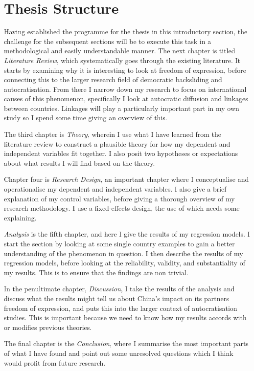 \section{Thesis Structure}
Having established the programme for the thesis in this introductory section, the challenge for the subsequent sections will be to execute this task in a methodological and easily understandable manner. The next chapter is titled \textit{Literature Review}, which systematically goes through the existing literature. It starts by examining why it is interesting to look at freedom of expression, before connecting this to the larger research field of democratic backsliding and autocratisation. From there I narrow down my research to focus on international causes of this phenomenon, specifically I look at autocratic diffusion and linkages between countries. Linkages will play a particularly important part in my own study so I spend some time giving an overview of this.

The third chapter is \textit{Theory}, wherein I use what I have learned from the literature review to construct a plausible theory for how my dependent and independent variables fit together. I also posit two hypotheses or expectations about what results I will find based on the theory.

Chapter four is \textit{Research Design}, an important chapter where I conceptualise and operationalise my dependent and independent variables. I also give a brief explanation of my control variables, before giving a thorough overview of my research methodology. I use a fixed-effects design, the use of which needs some explaining.

\textit{Analysis} is the fifth chapter, and here I give the results of my regression models. I start the section by looking at some single country examples to gain a better understanding of the phenomenon in question. I then describe the results of my regression models, before looking at the reliability, validity, and substantiality of my results. This is to ensure that the findings are non trivial.

In the penultimate chapter, \textit{Discussion}, I take the results of the analysis and discuss what the results might tell us about China's impact on its partners freedom of expression, and puts this into the larger context of autocratisation studies. This is important because we need to know how my results accords with or modifies previous theories.

The final chapter is the \textit{Conclusion}, where I summarise the most important parts of what I have found and point out some unresolved questions which I think would profit from future research.
